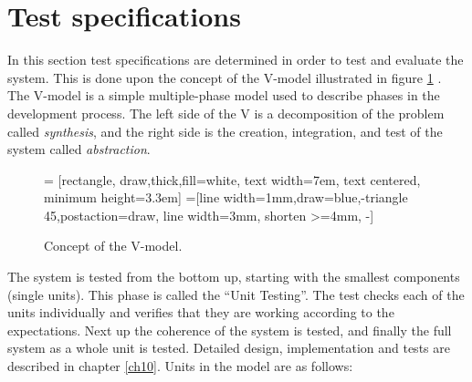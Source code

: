 \section{Test specifications}\label{sec:testspec}
In this section test specifications are determined in order to test and evaluate the system. This is done upon the concept of the V-model illustrated in figure \ref{fig:vmodel} \cite{vmodel}. The V-model is a simple multiple-phase model used to describe phases in the development process. The left side of the V is a decomposition of the problem called \textit{synthesis}, and the right side is the creation, integration, and test of the system called \textit{abstraction}.
\begin{figure}[H]
\centering
{} = [rectangle, draw,thick,fill=white, 
    text width=7em, text centered, minimum height=3.3em]
=[line width=1mm,draw=blue,-triangle 45,postaction={draw, line width=3mm, shorten >=4mm, -}]
\caption{Concept of the V-model.}
\label{fig:vmodel}
\end{figure}
%
The system is tested from the bottom up, starting with the smallest components (single units). This phase is called the ``Unit Testing''. The test checks each of the units individually and verifies that they are working according to the expectations. Next up the coherence of the system is tested, and finally the full system as a whole unit is tested. Detailed design, implementation and tests are described in chapter \ref{ch10}. Units in the model are as follows:


